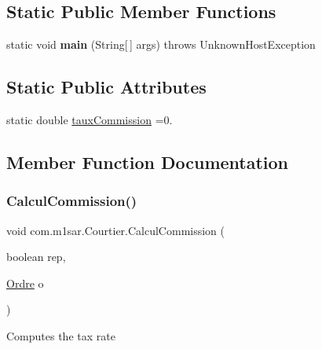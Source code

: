 \subsection*{Static Public Member Functions}
\begin{DoxyCompactItemize}
\item 
\mbox{\label{classcom_1_1m1sar_1_1_courtier_acf39c456b496674cccc31741262f4255}} 
static void {\bfseries main} (String\mbox{[}$\,$\mbox{]} args)  throws Unknown\+Host\+Exception 
\end{DoxyCompactItemize}
\subsection*{Static Public Attributes}
\begin{DoxyCompactItemize}
\item 
static double \hyperlink{classcom_1_1m1sar_1_1_courtier_ad00c315730363c06b266dec9f9cb8343}{taux\+Commission} =0.
\end{DoxyCompactItemize}


\subsection{Member Function Documentation}
\mbox{\label{classcom_1_1m1sar_1_1_courtier_af614a260bc606940e06e3efee5771611}} 
\subsubsection{\texorpdfstring{Calcul\+Commission()}{CalculCommission()}}
{\footnotesize\ttfamily void com.\+m1sar.\+Courtier.\+Calcul\+Commission (\begin{DoxyParamCaption}\item[{boolean}]{rep,  }\item[{\hyperlink{classcom_1_1m1sar_1_1_ordre}{Ordre}}]{o }\end{DoxyParamCaption})}

Computes the tax rate \mbox{\label{classcom_1_1m1sar_1_1_courtier_ac9e5e9ad51dbb22d38a67d7a859259a0}} 
